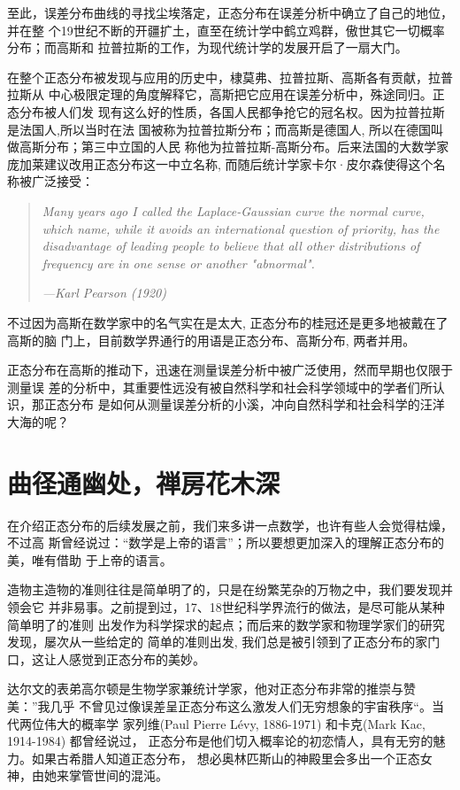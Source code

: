 至此，误差分布曲线的寻找尘埃落定，正态分布在误差分析中确立了自己的地位，并在整
个19世纪不断的开疆扩土，直至在统计学中鹤立鸡群，傲世其它一切概率分布；而高斯和
拉普拉斯的工作，为现代统计学的发展开启了一扇大门。

在整个正态分布被发现与应用的历史中，棣莫弗、拉普拉斯、高斯各有贡献，拉普拉斯从
中心极限定理的角度解释它，高斯把它应用在误差分析中，殊途同归。正态分布被人们发
现有这么好的性质，各国人民都争抢它的冠名权。因为拉普拉斯是法国人,所以当时在法
国被称为拉普拉斯分布；而高斯是德国人, 所以在德国叫做高斯分布；第三中立国的人民
称他为拉普拉斯-高斯分布。后来法国的大数学家庞加莱建议改用正态分布这一中立名称,
而随后统计学家卡尔·皮尔森使得这个名称被广泛接受：

\begin{quotation}
\emph{Many years ago I called the Laplace-Gaussian curve the normal curve,
which name, while it avoids an international question of priority,
has the disadvantage of leading people to believe that all other distributions
of frequency are in one sense or another "abnormal".}

\emph{ ---Karl Pearson (1920) }
\end{quotation}

不过因为高斯在数学家中的名气实在是太大, 正态分布的桂冠还是更多地被戴在了高斯的脑
门上，目前数学界通行的用语是正态分布、高斯分布, 两者并用。

正态分布在高斯的推动下，迅速在测量误差分析中被广泛使用，然而早期也仅限于测量误
差的分析中，其重要性远没有被自然科学和社会科学领域中的学者们所认识，那正态分布
是如何从测量误差分析的小溪，冲向自然科学和社会科学的汪洋大海的呢？

\section{曲径通幽处，禅房花木深}

在介绍正态分布的后续发展之前，我们来多讲一点数学，也许有些人会觉得枯燥，不过高
斯曾经说过：“数学是上帝的语言”；所以要想更加深入的理解正态分布的美，唯有借助
于上帝的语言。

造物主造物的准则往往是简单明了的，只是在纷繁芜杂的万物之中，我们要发现并领会它
并非易事。之前提到过，17、18世纪科学界流行的做法，是尽可能从某种简单明了的准则
出发作为科学探求的起点；而后来的数学家和物理学家们的研究发现，屡次从一些给定的
简单的准则出发, 我们总是被引领到了正态分布的家门口，这让人感觉到正态分布的美妙。

达尔文的表弟高尔顿是生物学家兼统计学家，他对正态分布非常的推崇与赞美：”我几乎
不曾见过像误差呈正态分布这么激发人们无穷想象的宇宙秩序“。当代两位伟大的概率学
家列维(Paul Pierre L\'{e}vy, 1886-1971) 和卡克(Mark Kac, 1914-1984) 都曾经说过，
正态分布是他们切入概率论的初恋情人，具有无穷的魅力。如果古希腊人知道正态分布，
想必奥林匹斯山的神殿里会多出一个正态女神，由她来掌管世间的混沌。

